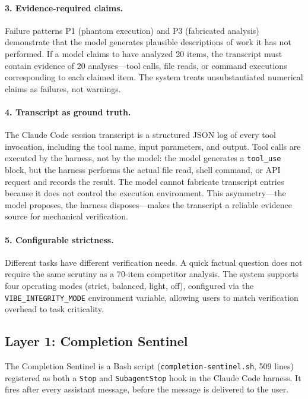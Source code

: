 \paragraph{3. Evidence-required claims.}
Failure patterns P1 (phantom execution) and P3 (fabricated analysis) demonstrate that the model generates plausible descriptions of work it has not performed.
If a model claims to have analyzed 20 items, the transcript must contain evidence of 20 analyses---tool calls, file reads, or command executions corresponding to each claimed item.
The system treats unsubstantiated numerical claims as failures, not warnings.

\paragraph{4. Transcript as ground truth.}
The Claude Code session transcript is a structured JSON log of every tool invocation, including the tool name, input parameters, and output.
Tool calls are executed by the harness, not by the model: the model generates a \texttt{tool\_use} block, but the harness performs the actual file read, shell command, or API request and records the result.
The model cannot fabricate transcript entries because it does not control the execution environment.
This asymmetry---the model proposes, the harness disposes---makes the transcript a reliable evidence source for mechanical verification.

\paragraph{5. Configurable strictness.}
Different tasks have different verification needs.
A quick factual question does not require the same scrutiny as a 70-item competitor analysis.
The system supports four operating modes (strict, balanced, light, off), configured via the \texttt{VIBE\_INTEGRITY\_MODE} environment variable, allowing users to match verification overhead to task criticality.


\subsection{Layer 1: Completion Sentinel}
\label{sec:sentinel}

The Completion Sentinel is a Bash script (\texttt{completion-sentinel.sh}, 509 lines) registered as both a \texttt{Stop} and \texttt{SubagentStop} hook in the Claude Code harness.
It fires after every assistant message, before the message is delivered to the user.

